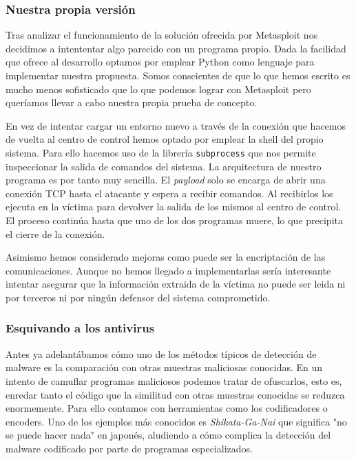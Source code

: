 \documentclass[12pt]{article}
\newcommand{\newpar} {
    \vskip 0.5cm
}
\begin{document}
            \subsubsection{Nuestra propia versión}
                Tras analizar el funcionamiento de la solución ofrecida por Metasploit nos decidimos a intententar algo parecido con un programa propio. Dada la facilidad que ofrece al desarrollo optamos por emplear Python como lenguaje para implementar nuestra propuesta. Somos conscientes de que lo que hemos escrito es mucho menos sofisticado que lo que podemos lograr con Metasploit pero queríamos llevar a cabo nuestra propia prueba de concepto.

                \newpar

                En vez de intentar cargar un entorno nuevo a través de la conexión que hacemos de vuelta al centro de control hemos optado por emplear la shell del propio sistema. Para ello hacemos uso de la librería \texttt{subprocess} que nos permite inspeccionar la salida de comandos del sistema. La arquitectura de nuestro programa es por tanto muy sencilla. El \textit{payload} solo se encarga de abrir una conexión TCP hasta el atacante y espera a recibir comandos. Al recibirlos los ejecuta en la víctima para devolver la salida de los mismos al centro de control. El proceso continúa hasta que uno de los dos programas muere, lo que precipita el cierre de la conexión.

                \newpar

                Asimismo hemos considerado mejoras como puede ser la encriptación de las comunicaciones. Aunque no hemos llegado a implementarlas sería interesante intentar asegurar que la información extraida de la víctima no puede ser leida ni por terceros ni por ningún defensor del sistema comprometido.

            \subsubsection{Esquivando a los antivirus}
                Antes ya adelantábamos cómo uno de los métodos típicos de detección de malware es la comparación con otras muestras maliciosas conocidas. En un intento de camuflar programas maliciosos podemos tratar de ofuscarlos, esto es, enredar tanto el código que la similitud con otras muestras conocidas se reduzca enormemente. Para ello contamos con herramientas como los codificadores o encoders. Uno de los ejemplos más conocidos es \textit{Shikata-Ga-Nai} que significa "no se puede hacer nada" en japonés, aludiendo a cómo complica la detección del malware codificado por parte de programas especializados.
\end{document}
